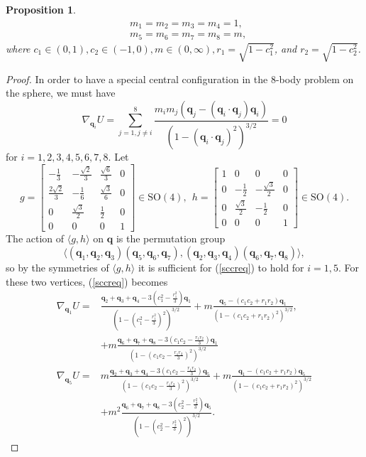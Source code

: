 \documentclass[12pt]{amsart}
\newtheorem{proposition}{Proposition}
\theoremstyle{definition}
\newcommand {\q} {\mathbf{q}}
\begin{document}
{\begin{proposition}
\begin{align*}
&m_1=m_2=m_3=m_4=1,\\
&m_5=m_6=m_7=m_8=m,\end{align*}
where $c_1 \in (0,1), c_2 \in (-1,0), m \in (0,\infty), r_1=\sqrt{1-c_1^2}$, and $r_2=\sqrt{1-c_2^2}$.
\end{proposition}
\begin{proof}
In order to have a special central configuration in the 8-body problem on the sphere, we must have \begin{equation}\label{sccreq}
\nabla_{\q_i} U=\sum\limits_{j=1, j\neq i}^8 \frac{m_im_j(\q_j-(\q_i \cdot \q_j)\q_i)}{(1-(\q_i \cdot \q_j)^2)^{3/2}}=0\end{equation} for $i=1,2,3,4,5,6, 7, 8$. Let 
\begin{equation*}
g=\begin{bmatrix}-\frac{1}{3} & -\frac{\sqrt{2}}{3} & \frac{\sqrt{6}}{3} & 0\\ \frac{2\sqrt{2}}{3} & -\frac{1}{6} & \frac{\sqrt{3}}{6} & 0\\ 0 & \frac{\sqrt{3}}{2} & \frac{1}{2} & 0\\ 0 & 0 & 0 & 1\end{bmatrix} \in \text{SO}(4),\ \ h=\begin{bmatrix}1 & 0 & 0 & 0\\ 0 & -\frac{1}{2} & -\frac{\sqrt{3}}{2} & 0\\ 0 & \frac{\sqrt{3}}{2} & -\frac{1}{2} & 0\\ 0 & 0 & 0 & 1\end{bmatrix} \in \text{SO}(4).\end{equation*}
The action of $\langle g, h \rangle$ on $\q$ is the permutation group $$\langle (\q_1, \q_2, \q_3)(\q_5, \q_6, \q_7), (\q_2, \q_3, \q_4)(\q_6, \q_7, \q_8)\rangle,$$ so by the symmetries of $\langle g, h \rangle$ it is sufficient for (\ref{sccreq}) to hold for $i=1,5$. For these two vertices, (\ref{sccreq}) becomes \begin{align*}
\nabla_{\q_1}U=&\frac{\q_2+\q_3+\q_4-3(c_1^2-\frac{r_1^2}{3})\q_1}{(1-(c_1^2-\frac{r_1^2}{3})^2)^{3/2}}+m\frac{\q_5-(c_1c_2+r_1r_2)\q_1}{(1-(c_1c_2+r_1r_2)^2)^{3/2}},\\
&+m\frac{\q_6+\q_7+\q_8-3(c_1c_2-\frac{r_1r_2}{3})\q_1}{(1-(c_1c_2-\frac{r_1r_2}{3})^2)^{3/2}}\\
\nabla_{\q_5}U=&m\frac{\q_2+\q_3+\q_4-3(c_1c_2-\frac{r_1r_2}{3})\q_5}{(1-(c_1c_2-\frac{r_1r_2}{3})^2)^{3/2}}+m\frac{\q_1-(c_1c_2+r_1r_2)\q_5}{(1-(c_1c_2+r_1r_2)^2)^{3/2}}\\
&+m^2\frac{\q_6+\q_7+\q_8-3(c_2^2-\frac{r_2^2}{3})\q_5}{(1-(c_2^2-\frac{r_2^2}{3})^2)^{3/2}}.

\end{align*}
\end{proof}}
\end{document}
